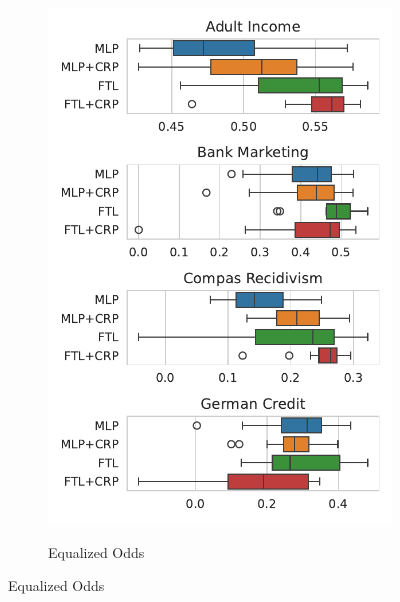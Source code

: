 \begin{figure}[!ht]
\begin{subfigure}{.32\linewidth}
    \includegraphics[width=1\linewidth]{images/boxplot_mcc_opportunity_crp.pdf}
\end{subfigure}
\begin{subfigure}{.32\linewidth}
    \caption{Equalized Odds}
    \label{fig:boxplot_mcc_odds_crp}

\end{subfigure}
\end{figure}
